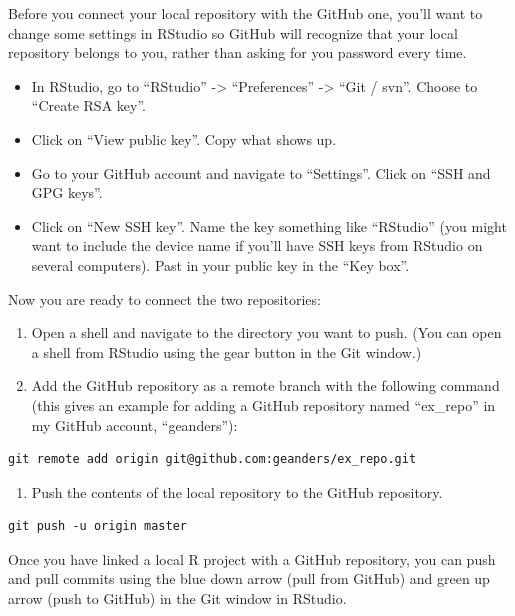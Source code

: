 \documentclass[]{tufte-book}
\providecommand{\tightlist}{%
  \setlength{\itemsep}{0pt}\setlength{\parskip}{0pt}}
\begin{document}
Before you connect your local repository with the GitHub one, you'll want to change
some settings in RStudio so GitHub will recognize that your local repository
belongs to you, rather than asking for you password every time.

\begin{itemize}
\tightlist
\item
  In RStudio, go to ``RStudio'' -\textgreater{} ``Preferences'' -\textgreater{} ``Git / svn''. Choose to ``Create
  RSA key''.
\item
  Click on ``View public key''. Copy what shows up.
\item
  Go to your GitHub account and navigate to ``Settings''. Click on ``SSH and GPG keys''.
\item
  Click on ``New SSH key''. Name the key something like ``RStudio'' (you might want
  to include the device name if you'll have SSH keys from RStudio on several
  computers). Past in your public key in the ``Key box''.
\end{itemize}

Now you are ready to connect the two repositories:

\begin{enumerate}
\def\labelenumi{\arabic{enumi}.}
\tightlist
\item
  Open a shell and navigate
  to the directory you want to push. (You can open a shell from RStudio using the
  gear button in the Git window.)
\item
  Add the GitHub repository as a remote branch
  with the following command (this gives an example for adding a GitHub repository
  named ``ex\_repo'' in my GitHub account, ``geanders''):
\end{enumerate}

\begin{verbatim}
git remote add origin git@github.com:geanders/ex_repo.git
\end{verbatim}

\begin{enumerate}
\def\labelenumi{\arabic{enumi}.}
\setcounter{enumi}{2}
\tightlist
\item
  Push the contents of the local repository to the GitHub repository.
\end{enumerate}

\begin{verbatim}
git push -u origin master
\end{verbatim}

Once you have linked a local R project with a GitHub repository, you can push
and pull commits using the blue down arrow (pull from GitHub) and green up arrow
(push to GitHub) in the Git window in RStudio.
\end{document}
